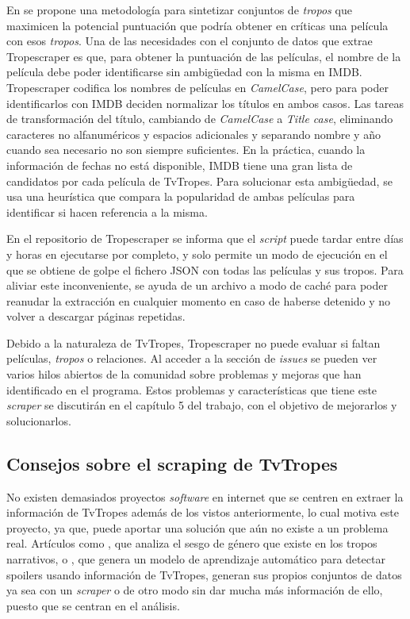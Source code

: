 En \cite{garcia2020startroper} se propone una metodología para sintetizar
conjuntos de \textit{tropos} que maximicen la potencial puntuación que podría
obtener en críticas una película con esos \textit{tropos}. Una de las
necesidades con el conjunto de datos que extrae Tropescraper es que, para
obtener la puntuación de las películas, el nombre de la película debe poder
identificarse sin ambigüedad con la misma en IMDB. Tropescraper codifica los
nombres de películas en \textit{CamelCase}, pero para poder identificarlos con
IMDB deciden normalizar los títulos en ambos casos. Las tareas de transformación
del título, cambiando de \textit{CamelCase} a \textit{Title case}, eliminando
caracteres no alfanuméricos y espacios adicionales y separando nombre y año
cuando sea necesario no son siempre suficientes. En la práctica, cuando la
información de fechas no está disponible, IMDB tiene una gran lista de
candidatos por cada película de TvTropes. Para solucionar esta ambigüedad, se
usa una heurística que compara la popularidad de ambas películas para
identificar si hacen referencia a la misma. 

En el repositorio de Tropescraper se informa que el \textit{script} puede tardar
entre días y horas en ejecutarse por completo, y solo permite un modo de
ejecución en el que se obtiene de golpe el fichero JSON con todas las películas
y sus tropos. Para aliviar este inconveniente, se ayuda de un archivo a modo de
caché para poder reanudar la extracción en cualquier momento en caso de haberse
detenido y no volver a descargar páginas repetidas. 

Debido a la naturaleza de TvTropes, Tropescraper no puede evaluar si faltan
películas, \textit{tropos} o relaciones. Al acceder a la sección de
\textit{issues} se pueden ver varios hilos abiertos de la comunidad sobre
problemas y mejoras que han identificado en el programa. Estos problemas y
características que tiene este \textit{scraper} se discutirán en el capítulo 5
del trabajo, con el objetivo de mejorarlos y solucionarlos.

\subsection{Consejos sobre el scraping de TvTropes}
No existen demasiados proyectos \textit{software} en internet que se centren en
extraer la información de TvTropes además de los vistos anteriormente, lo cual
motiva este proyecto, ya que, puede aportar una solución que aún no existe a un
problema real. Artículos como \cite{gala2020analyzing}, que analiza el sesgo de
género que existe en los tropos narrativos, o \cite{boyd2013spoiler}, que genera
un modelo de aprendizaje automático para detectar spoilers usando información de
TvTropes, generan sus propios conjuntos de datos ya sea con un \textit{scraper}
o de otro modo sin dar mucha más información de ello, puesto que se centran en
el análisis. 

